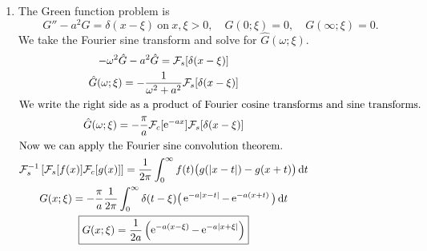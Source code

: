 {\begin{Solution}
\begin{enumerate}
    is not automatically satisfied.  We had to find a value of $y'(0)$ so
    that $y(\infty) = 0$.
  \item
    The Green function problem is
    \[
    G'' - a^2 G = \delta(x - \xi)\ \mathrm{on}\ x,\xi > 0, 
    \quad G(0; \xi) = 0, \quad G(\infty; \xi) = 0.
    \]
    We take the Fourier sine transform and solve for $\hat{G}(\omega; \xi)$.
    \begin{gather*}
      - \omega^2 \hat{G} - a^2 \hat{G} = \mathcal{F}_s[\delta(x - \xi)] 
      \\
      \hat{G}(\omega; \xi) = - \frac{ 1 }{\omega^2 + a^2} \mathcal{F}_s[\delta(x - \xi)] 
      \\
      \intertext{We write the right side as a product of Fourier 
        cosine transforms and sine transforms.}
      \hat{G}(\omega; \xi) = - \frac{\pi}{a} \mathcal{F}_c[\mathop{\mathrm{e}}\nolimits^{- a x}] \mathcal{F}_s[\delta(x - \xi)] 
      \\
      \intertext{Now we can apply the Fourier sine convolution theorem.}
      \mathcal{F}_s^{-1} \left[ \mathcal{F}_s[f(x)] \mathcal{F}_c[g(x)] \right]
      = \frac{1}{2 \pi} \int_0^\infty f(t) \big( g(|x - t|) - g(x + t) \big)\,\mathrm{d} t
      \\
      G(x; \xi) = - \frac{\pi}{a} \frac{1}{2\pi} \int_0^\infty \delta(t - \xi)
      \big( \mathop{\mathrm{e}}\nolimits^{- a |x - t|} - \mathop{\mathrm{e}}\nolimits^{- a (x + t)} \big) \,\mathrm{d} t 
      \\
      \boxed{
        G(x; \xi) = \frac{1}{2 a} \left( \mathop{\mathrm{e}}\nolimits^{- a (x - \xi)} - \mathop{\mathrm{e}}\nolimits^{- a |x + \xi|} \right)
        }
    \end{gather*}
  \end{enumerate}
\end{Solution}











}
